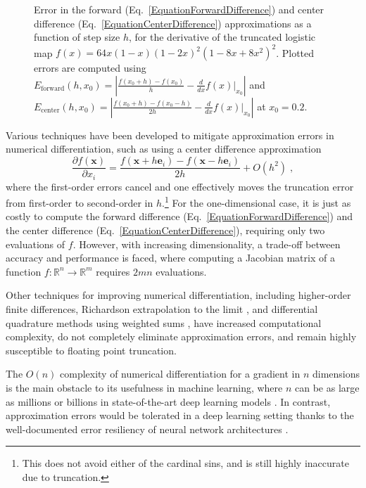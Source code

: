 \documentclass[twoside,11pt]{article}
\begin{document}
\begin{figure}
  \centering
  \resizebox{0.82\textwidth}{!}{\small}
  \caption{Error in the forward (Eq.~\ref{EquationForwardDifference}) and center difference (Eq.~\ref{EquationCenterDifference}) approximations as a function of step size $h$, for the derivative of the truncated logistic map ${f(x)=64x(1 - x)(1 - 2 x)^2 (1 - 8 x + 8 x^2)^2}$. Plotted errors are computed using ${E_{\mathrm{forward}}(h,x_0)=\left|\frac{f(x_0+h)-f(x_0)}{h} - \frac{d}{dx}f(x)\big|_{x_0}\right|}$ and ${E_{\mathrm{center}}(h,x_0)=\left|\frac{f(x_0+h)-f(x_0-h)}{2h} - \frac{d}{dx}f(x)\big|_{x_0}\right|}$ at $x_0=0.2$\;.}
  \label{FigureApproximationError}
\end{figure}

Various techniques have been developed to mitigate approximation errors in numerical differentiation, such as using a center difference approximation
\begin{equation}
  \label{EquationCenterDifference}
  \frac{\partial f(\mathbf{x})}{\partial x_i} = \frac{f(\mathbf{x} + h \mathbf{e}_i) - f(\mathbf{x} - h \mathbf{e}_i)}{2h} + O(h^{2})\;,
\end{equation}
where the first-order errors cancel and one effectively moves the truncation error from first-order to second-order in $h$.\footnote{This does not avoid either of the cardinal sins, and is still highly inaccurate due to truncation.} For the one-dimensional case, it is just as costly to compute the forward difference (Eq.~\ref{EquationForwardDifference}) and the center difference (Eq.~\ref{EquationCenterDifference}), requiring only two evaluations of $f$. However, with increasing dimensionality, a trade-off between accuracy and performance is faced, where computing a Jacobian matrix of a function $f: \mathbb{R}^n \to \mathbb{R}^m$ requires $2mn$ evaluations.

Other techniques for improving numerical differentiation, including higher-order finite differences, Richardson extrapolation to the limit \citep{Brezinski1991}, and differential quadrature methods using weighted sums \citep{Bert1996}, have increased computational complexity, do not completely eliminate approximation errors, and remain highly susceptible to floating point truncation.

The $O(n)$ complexity of numerical differentiation for a gradient in $n$ dimensions is the main obstacle to its usefulness in machine learning, where $n$ can be as large as millions or billions in state-of-the-art deep learning models \citep{shazeer2017outrageously}. In contrast, approximation errors would be tolerated in a deep learning setting thanks to the well-documented error resiliency of neural network architectures \citep{gupta2015deep}.
\end{document}
